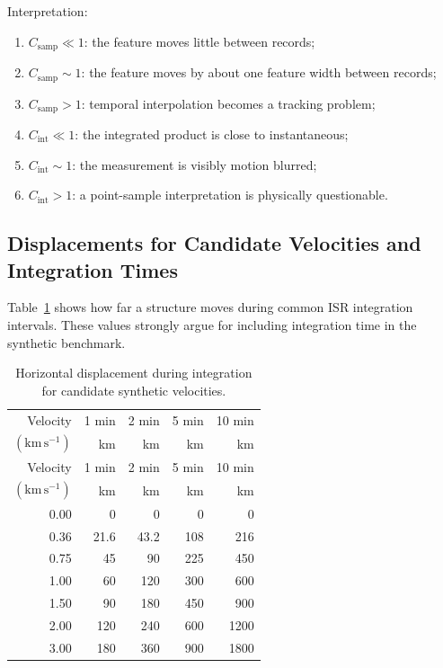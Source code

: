 \documentclass[11pt]{article}
\newcommand{\kmps}{\mathrm{km\,s^{-1}}}
\begin{document}
Interpretation:
\begin{enumerate}[leftmargin=*]
  \item $C_{\mathrm{samp}}\ll 1$: the feature moves little between records;
  \item $C_{\mathrm{samp}}\sim 1$: the feature moves by about one feature width between records;
  \item $C_{\mathrm{samp}}>1$: temporal interpolation becomes a tracking problem;
  \item $C_{\mathrm{int}}\ll 1$: the integrated product is close to instantaneous;
  \item $C_{\mathrm{int}}\sim 1$: the measurement is visibly motion blurred;
  \item $C_{\mathrm{int}}>1$: a point-sample interpretation is physically questionable.
\end{enumerate}

\subsection{Displacements for Candidate Velocities and Integration Times}

Table~\ref{tab:velocity_displacement} shows how far a structure moves during common ISR
integration intervals. These values strongly argue for including integration time in the synthetic
benchmark.

\begin{longtable}{rrrrr}
\caption{Horizontal displacement during integration for candidate synthetic velocities.}
\label{tab:velocity_displacement}\\
\toprule
Velocity & 1 min & 2 min & 5 min & 10 min \\
$(\kmps)$ & km & km & km & km \\
\midrule
\endfirsthead
\toprule
Velocity & 1 min & 2 min & 5 min & 10 min \\
$(\kmps)$ & km & km & km & km \\
\midrule
\endhead
0.00 & 0 & 0 & 0 & 0 \\
0.36 & 21.6 & 43.2 & 108 & 216 \\
0.75 & 45 & 90 & 225 & 450 \\
1.00 & 60 & 120 & 300 & 600 \\
1.50 & 90 & 180 & 450 & 900 \\
2.00 & 120 & 240 & 600 & 1200 \\
3.00 & 180 & 360 & 900 & 1800 \\
\bottomrule
\end{longtable}
\end{document}
